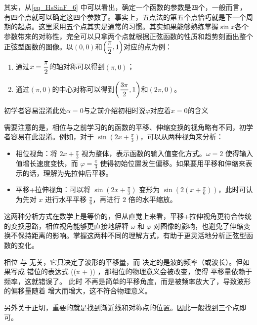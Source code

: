 其实，从\autoref{eq_HsSinF_6} 中可以看出，确定一个函数的参数是四个，一般而言，有四个点就可以确定这四个参数了。事实上，五点法的第五个点恰巧就是下一个周期的起点。这里采用五个点其实是通常的习惯。其实如果能够熟练掌握$\sin x$各个参数带来的对称性，完全可以只拿两个点就根据正弦函数的性质和趋势刻画出整个正弦型函数的图像。以$(0,0)$和$\displaystyle\left({\pi\over2},1\right)$对应的点为例：
\begin{enumerate}
\item 通过$x=\displaystyle{\pi\over2}$的轴对称可以得到$\displaystyle\left(\pi,0\right)$；
\item 通过$\displaystyle\left(\pi,0\right)$的中心对称可以得到$\displaystyle\left({3\pi\over2},1\right)$和$\displaystyle\left(2\pi,0\right)$。
\end{enumerate}




初学者容易混淆此处$\alpha=0$与之前介绍初相时说$\varphi$对应着$x=0$的含义


需要注意的是，相位与之前学习的的函数的平移、伸缩变换的视角略有不同，初学者容易在此混淆。例如，对于 $\displaystyle\sin(2x + \frac{\pi}{3})$，可以从两种视角来分析：
\begin{itemize}
\item 相位视角：将 $\displaystyle2x + \frac{\pi}{3}$ 视为整体，表示函数的输入值变化方式。$\omega = 2$ 使得输入值增长速度变快，而 $\displaystyle\varphi = \frac{\pi}{3}$ 使得初始位置发生偏移。如果要用平移和伸缩来表示的话，理解为先拉伸后平移。
\item 平移+拉伸视角：可以将 $\displaystyle\sin(2x + \frac{\pi}{3})$ 变形为 $\displaystyle\sin\left(2(x + \frac{\pi}{6})\right)$，此时可认为先对 $x$ 进行水平平移 $\displaystyle\frac{\pi}{6}$，再进行 $2$ 倍的水平缩放。
\end{itemize}

这两种分析方式在数学上是等价的，但从直觉上来看，平移+拉伸视角更符合传统的变换思路，相位视角能够更直接地解释 $\omega$ 和 $\varphi$ 对图像的影响，也避免了伸缩变换不保持距离的影响。掌握这两种不同的理解方式，有助于更灵活地分析正弦型函数的变化。

相位  \phi  与  \omega  无关，它只决定了波形的平移量，而  \omega  决定的是波的频率（或波长）。但如果写成 错位的表达式  \sin(\omega(x + \phi)) ，那相位的物理意义会被改变，使得 平移量依赖于频率，这就错误了。
此时  \phi  不再是简单的平移角度，而是被频率放大了，导致波形的偏移量随着  \omega  增大而增大，这不符合物理意义。

另外关于正切，重要的就是找到渐近线和对称点的位置。因此一般找到三个点即可。

